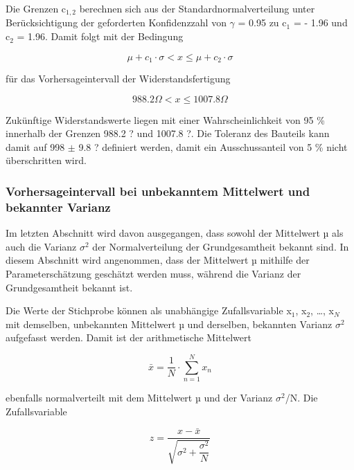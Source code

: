 \noindent Die Grenzen c${}_{1,2}$ berechnen sich aus der Standardnormalverteilung unter Ber\"{u}cksichtigung der geforderten Konfidenzzahl von $\gamma$ = 0.95 zu c${}_{1}$ = - 1.96 und c${}_{2}$ = 1.96. Damit folgt mit der Bedingung

\begin{equation}\label{eq:fivehundredtwenty}
\mu +c_{1} \cdot \sigma <x\le \mu +c_{2} \cdot \sigma
\end{equation}

\noindent f\"{u}r das Vorhersageintervall der Widerstandsfertigung 

\begin{equation}\label{eq:fivehundredtwentyone}
988.2 \Omega <x\le 1007.8 \Omega
\end{equation}

\noindent Zuk\"{u}nftige Widerstandswerte liegen mit einer Wahrscheinlichkeit von 95 \% innerhalb der Grenzen 988.2 ? und 1007.8 ?. Die Toleranz des Bauteils kann damit auf 998 $\mathrm{\pm}$ 9.8 ? definiert werden, damit ein Ausschussanteil von 5 \% nicht \"{u}berschritten wird.

\subsubsection{Vorhersageintervall bei unbekanntem Mittelwert und bekannter Varianz}

\noindent Im letzten Abschnitt wird davon ausgegangen, dass sowohl der Mittelwert µ als auch die Varianz $\sigma^{2}$ der Normalverteilung der Grundgesamtheit bekannt sind. In diesem Abschnitt wird angenommen, dass der Mittelwert µ mithilfe der Parametersch\"{a}tzung gesch\"{a}tzt werden muss, w\"{a}hrend die Varianz der Grundgesamtheit bekannt ist.\newline

\noindent Die Werte der Stichprobe k\"{o}nnen als unabh\"{a}ngige Zufallsvariable x${}_{1}$, x${}_{2}$, {\dots}, x${}_{N}$ mit demselben, unbekannten Mittelwert µ und derselben, bekannten Varianz $\sigma^{2}$ aufgefasst werden. Damit ist der arithmetische Mittelwert 

\begin{equation}\label{eq:fivehundredtwentytwo}
\bar{x}=\dfrac{1}{N} \cdot \sum _{n=1}^{N}x_{n}
\end{equation}

\noindent ebenfalls normalverteilt mit dem Mittelwert µ und der Varianz $\sigma^{2}$/N. Die Zufallsvariable

\begin{equation}\label{eq:fivehundredtwentythree}
z=\dfrac{x-\bar{x}}{\sqrt{\sigma ^{2} +\dfrac{\sigma ^{2} }{N}}}
\end{equation}

